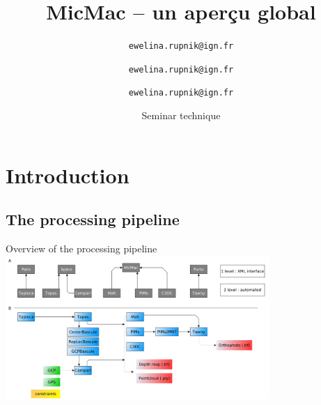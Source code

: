 \documentclass{beamer}
\title{MicMac -- un aperçu global}
\institute{IGN}
\date[25 May 2018]{Seminar technique}
\author[E Rupnik]{\texttt{ewelina.rupnik@ign.fr}}
\author[J-M Mueller]{\texttt{ewelina.rupnik@ign.fr}}
\author[M Pierrot-Deseilligny]{\texttt{ewelina.rupnik@ign.fr}}
\begin{document}
    \begin{frame}[plain]
        \titlepage{}
    \end{frame}

	\tableofcontents
	

	
	
      \section{Introduction}  
        \subsection*{The processing pipeline}
            \begin{frame}{Overview of the processing pipeline}
                \includegraphics[width=10cm]{images/architecture_prntscr.png}
                
                
            \end{frame}
\end{document}
